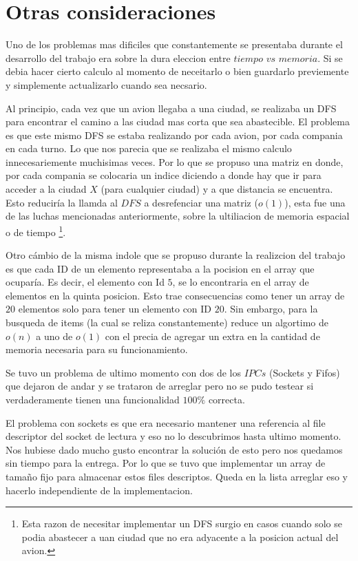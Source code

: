 \documentclass[a4paper,12pt,spanish]{article} %
\begin{document}
\section{Otras consideraciones}

Uno de los problemas mas dificiles que constantemente se presentaba
durante el desarrollo del trabajo era sobre la dura eleccion entre
$tiempo$ $vs$ $memoria$. Si se debia hacer cierto calculo al momento
de neceitarlo o bien guardarlo previemente y simplemente actualizarlo
cuando sea necsario.

Al principio, cada vez que un avion llegaba a una ciudad, se realizaba
un DFS para encontrar el camino a las ciudad mas corta que sea abastecible.
El problema es que este mismo DFS se estaba realizando por cada avion,
por cada compania en cada turno. Lo que nos parecia que se realizaba
el mismo calculo innecesariemente muchisimas veces. Por lo que se
propuso una matriz en donde, por cada compania se colocaria un indice
diciendo a donde hay que ir para acceder a la ciudad $X$ (para cualquier
ciudad) y a que distancia se encuentra. Esto reduciría la llamda al
$DFS$ a desrefenciar una matriz ($o(1)$), esta fue una de las luchas
mencionadas anteriormente, sobre la ultiliacion de memoria espacial
o de tiempo%
\footnote{Esta razon de necesitar implementar un DFS surgio en casos cuando
solo se podia abastecer a uan ciudad que no era adyacente a la posicion
actual del avion.%
}.

Otro cámbio de la misma indole que se propuso durante la realizcion
del trabajo es que cada ID de un elemento representaba a la pocision
en el array que ocuparía. Es decir, el elemento con Id $5$, se lo
encontraria en el array de elementos en la quinta posicion. Esto trae
consecuencias como tener un array de $20$ elementos solo para tener
un elemento con ID $20$. Sin embargo, para la busqueda de items (la
cual se reliza constantemente) reduce un algortimo de $o(n)$ a uno
de $o(1)$ con el precia de agregar un extra en la cantidad de memoria
necesaria para su funcionamiento.

Se tuvo un problema de ultimo momento con dos de los $IPCs$ (Sockets
y Fifos) que dejaron de andar y se trataron de arreglar pero no se
pudo testear si verdaderamente tienen una funcionalidad $100\%$ correcta. 

El problema con sockets es que era necesario mantener una referencia al file 
descriptor del socket de lectura y eso no lo descubrimos hasta ultimo momento.
Nos hubiese dado mucho gusto encontrar la solución  de esto pero nos quedamos 
sin tiempo para la entrega. Por lo que se tuvo que 
implementar un array de tamaño fijo para almacenar estos files descriptos.
Queda en la lista arreglar eso y hacerlo independiente de la implementacion.
\end{document}
